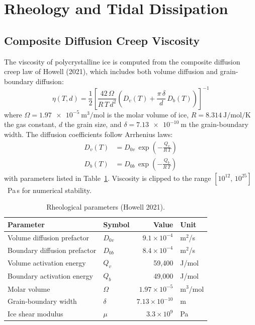 \documentclass[11pt,a4paper]{article}
\begin{document}
\section{Rheology and Tidal Dissipation}
\label{sec:rheology}

\subsection{Composite Diffusion Creep Viscosity}

The viscosity of polycrystalline ice is computed from the composite
diffusion creep law of Howell (2021), which includes both volume
diffusion and grain-boundary diffusion:
\begin{equation}
\eta(T, d) = \frac{1}{2}\left[
  \frac{42\,\Omega}{R\,T\,d^2}
  \left(D_v(T) + \frac{\pi\,\delta}{d}\,D_b(T)\right)
\right]^{-1}
\label{eq:viscosity}
\end{equation}
where $\Omega = \SI{1.97e-5}{\metre\cubed\per\mole}$ is the molar
volume of ice, $R = \SI{8.314}{\joule\per\mole\per\kelvin}$ the gas
constant, $d$ the grain size, and $\delta = \SI{7.13e-10}{\metre}$
the grain-boundary width. The diffusion coefficients follow Arrhenius
laws:
\begin{align}
D_v(T) &= D_{0v}\,\exp\!\left(-\frac{Q_v}{R\,T}\right) \\
D_b(T) &= D_{0b}\,\exp\!\left(-\frac{Q_b}{R\,T}\right)
\label{eq:diffusion}
\end{align}
with parameters listed in Table~\ref{tab:rheology}. Viscosity is
clipped to the range $[10^{12},\, 10^{25}]$~Pa\,s for numerical
stability.

\begin{table}[h]
\centering
\caption{Rheological parameters (Howell 2021).}
\label{tab:rheology}
\begin{tabular}{llrl}
\toprule
\textbf{Parameter} & \textbf{Symbol} & \textbf{Value} & \textbf{Unit} \\
\midrule
Volume diffusion prefactor  & $D_{0v}$ & $9.1 \times 10^{-4}$ & m$^2$/s \\
Boundary diffusion prefactor & $D_{0b}$ & $8.4 \times 10^{-4}$ & m$^2$/s \\
Volume activation energy    & $Q_v$    & 59,400 & J/mol \\
Boundary activation energy  & $Q_b$    & 49,000 & J/mol \\
Molar volume                & $\Omega$ & $1.97 \times 10^{-5}$ & m$^3$/mol \\
Grain-boundary width        & $\delta$ & $7.13 \times 10^{-10}$ & m \\
Ice shear modulus            & $\mu$    & $3.3 \times 10^{9}$ & Pa \\
\bottomrule
\end{tabular}
\end{table}
\end{document}

